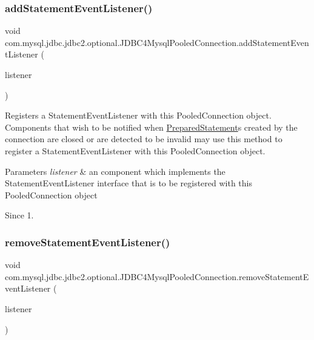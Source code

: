 \subsubsection{\texorpdfstring{add\+Statement\+Event\+Listener()}{addStatementEventListener()}}
{\footnotesize\ttfamily void com.\+mysql.\+jdbc.\+jdbc2.\+optional.\+J\+D\+B\+C4\+Mysql\+Pooled\+Connection.\+add\+Statement\+Event\+Listener (\begin{DoxyParamCaption}\item[{Statement\+Event\+Listener}]{listener }\end{DoxyParamCaption})}

Registers a {\ttfamily Statement\+Event\+Listener} with this {\ttfamily Pooled\+Connection} object. Components that wish to be notified when {\ttfamily \mbox{\hyperlink{classcom_1_1mysql_1_1jdbc_1_1_prepared_statement}{Prepared\+Statement}}}s created by the connection are closed or are detected to be invalid may use this method to register a {\ttfamily Statement\+Event\+Listener} with this {\ttfamily Pooled\+Connection} object.


\begin{DoxyParams}{Parameters}
{\em listener} & an component which implements the {\ttfamily Statement\+Event\+Listener} interface that is to be registered with this {\ttfamily Pooled\+Connection} object\\
\hline
\end{DoxyParams}
\begin{DoxySince}{Since}
1. 
\end{DoxySince}
\mbox{\label{classcom_1_1mysql_1_1jdbc_1_1jdbc2_1_1optional_1_1_j_d_b_c4_mysql_pooled_connection_a85fee01b184f403b8d44d40502c4f5ef}} 
\subsubsection{\texorpdfstring{remove\+Statement\+Event\+Listener()}{removeStatementEventListener()}}
{\footnotesize\ttfamily void com.\+mysql.\+jdbc.\+jdbc2.\+optional.\+J\+D\+B\+C4\+Mysql\+Pooled\+Connection.\+remove\+Statement\+Event\+Listener (\begin{DoxyParamCaption}\item[{Statement\+Event\+Listener}]{listener }\end{DoxyParamCaption})}

